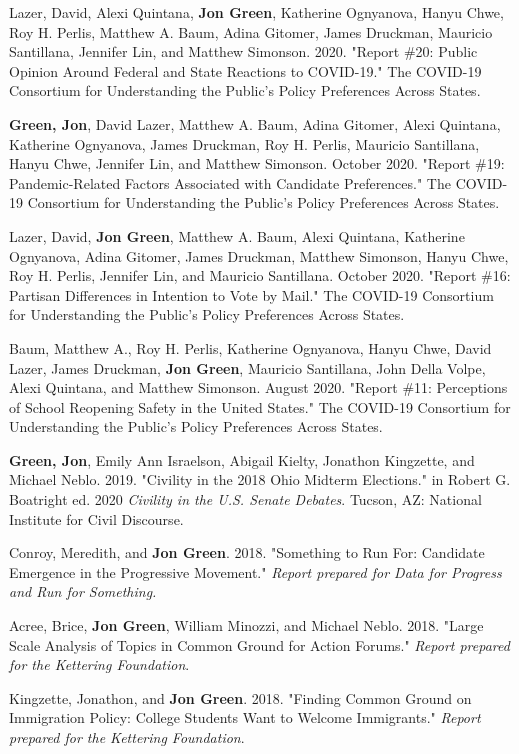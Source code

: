 \documentclass[letterpaper]{article}
\renewenvironment{itemize}{
  \begin{list}{}{
    \setlength{\leftmargin}{1.5em}
  }
}{
  \end{list}
}
\begin{document}
\begin{itemize}
\item Lazer, David, Alexi Quintana, \textbf{Jon Green}, Katherine Ognyanova, Hanyu Chwe, Roy H. Perlis, Matthew A. Baum, Adina Gitomer, James Druckman, Mauricio Santillana, Jennifer Lin, and Matthew Simonson. 2020. "Report \#20: Public Opinion Around Federal and State Reactions to COVID-19." The COVID-19 Consortium for Understanding the Public’s Policy Preferences Across States.

\item \textbf{Green, Jon}, David Lazer, Matthew A. Baum, Adina Gitomer, Alexi Quintana, Katherine Ognyanova, James Druckman, Roy H. Perlis, Mauricio Santillana, Hanyu Chwe, Jennifer Lin, and Matthew Simonson. October 2020. "Report \#19: Pandemic-Related Factors Associated with Candidate Preferences." The COVID-19 Consortium for Understanding the Public’s Policy Preferences Across States.

\item Lazer, David, \textbf{Jon Green}, Matthew A. Baum, Alexi Quintana, Katherine Ognyanova, Adina Gitomer, James Druckman, Matthew Simonson, Hanyu Chwe, Roy H. Perlis, Jennifer Lin, and Mauricio Santillana. October 2020. "Report \#16: Partisan Differences in Intention to Vote by Mail." The COVID-19 Consortium for Understanding the Public’s Policy Preferences Across States.

\item Baum, Matthew A., Roy H. Perlis, Katherine Ognyanova, Hanyu Chwe, David Lazer, James Druckman, \textbf{Jon Green}, Mauricio Santillana, John Della Volpe, Alexi Quintana, and Matthew Simonson. August 2020. "Report \#11: Perceptions of School Reopening Safety in the United States." The COVID-19 Consortium for Understanding the Public’s Policy Preferences Across States.

\item \textbf{Green, Jon}, Emily Ann Israelson, Abigail Kielty, Jonathon Kingzette, and Michael Neblo. 2019. "Civility in the 2018 Ohio Midterm Elections." in Robert G. Boatright ed. 2020 \textit{Civility in the U.S. Senate Debates}. Tucson, AZ: National Institute for Civil Discourse.

\item Conroy, Meredith, and \textbf{Jon Green}. 2018. "Something to Run For: Candidate Emergence in the Progressive Movement." \textit{Report prepared for Data for Progress and Run for Something.}

\item Acree, Brice, \textbf{Jon Green}, William Minozzi, and Michael Neblo. 2018. "Large Scale Analysis of Topics in Common Ground for Action Forums." \textit{Report prepared for the Kettering Foundation}.

\item Kingzette, Jonathon, and \textbf{Jon Green}. 2018. "Finding Common Ground on Immigration Policy: College Students Want to Welcome Immigrants." \textit{Report prepared for the Kettering Foundation}.
\end{itemize}
\end{document}
